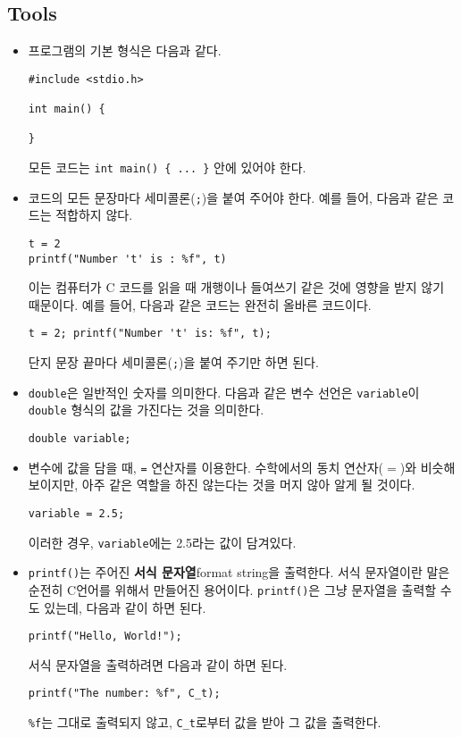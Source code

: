 \documentclass[../main.tex]{subfiles}
\begin{document}
\subsection{Tools}
\begin{itemize}
\item 프로그램의 기본 형식은 다음과 같다.
\begin{verbatim}
#include <stdio.h>

int main() {

}
\end{verbatim}
  모든 코드는 \texttt{int main() \{ ... \}} 안에 있어야 한다.
\item 코드의 모든 문장마다 세미콜론(\texttt{;})을 붙여 주어야
  한다. 예를 들어, 다음과 같은 코드는 적합하지 않다.
\begin{verbatim}
t = 2
printf("Number 't' is : %f", t)
\end{verbatim}
  이는 컴퓨터가 C 코드를 읽을 때 개행이나 들여쓰기 같은 것에 영향을
  받지 않기 때문이다. 예를 들어, 다음과 같은 코드는 완전히 올바른
  코드이다.
\begin{verbatim}
t = 2; printf("Number 't' is: %f", t);
\end{verbatim}
  단지 문장 끝마다 세미콜론(\texttt{;})을 붙여 주기만 하면 된다.
\item \texttt{double}은 일반적인 숫자를 의미한다. 다음과 같은 변수
  선언은 \texttt{variable}이 \texttt{double} 형식의 값을 가진다는 것을
  의미한다.
\begin{verbatim}
double variable;
\end{verbatim}
\item 변수에 값을 담을 때, \texttt{=} 연산자를 이용한다. 수학에서의
  동치 연산자($=$)와 비슷해 보이지만, 아주 같은 역할을 하진 않는다는
  것을 머지 않아 알게 될 것이다.
\begin{verbatim}
variable = 2.5;
\end{verbatim}
  이러한 경우, \texttt{variable}에는 2.5라는 값이 담겨있다.
\item \texttt{printf()}는 주어진 \textbf{서식 문자열}\small{format
    string}을 출력한다. 서식 문자열이란 말은 순전히 C언어를 위해서
  만들어진 용어이다. \texttt{printf()}은 그냥 문자열을 출력할 수도
  있는데, 다음과 같이 하면 된다.
\begin{verbatim}
printf("Hello, World!");
\end{verbatim}
  서식 문자열을 출력하려면 다음과 같이 하면 된다.
\begin{verbatim}
printf("The number: %f", C_t);
\end{verbatim}
  \texttt{\%f}는 그대로 출력되지 않고, \texttt{C\_t}로부터 값을 받아
  그 값을 출력한다.


\end{itemize}
\end{document}
